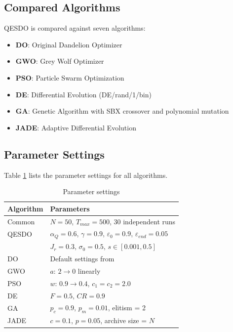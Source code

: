 \documentclass[preprint,12pt]{elsarticle}
\begin{document}
\subsection{Compared Algorithms}
\label{subsec:competitors}

QESDO is compared against seven algorithms:
\begin{itemize}
    \item \textbf{DO}: Original Dandelion Optimizer \cite{zhao2022dandelion}
    \item \textbf{GWO}: Grey Wolf Optimizer \cite{mirjalili2014grey}
    \item \textbf{PSO}: Particle Swarm Optimization \cite{kennedy1995particle}
    \item \textbf{DE}: Differential Evolution (DE/rand/1/bin) \cite{storn1997differential}
    \item \textbf{GA}: Genetic Algorithm with SBX crossover and polynomial mutation
    \item \textbf{JADE}: Adaptive Differential Evolution \cite{zhang2009jade}
\end{itemize}

\subsection{Parameter Settings}
\label{subsec:parameters}

Table \ref{tab:parameters} lists the parameter settings for all algorithms.

\begin{table}[htbp]
\centering
\caption{Parameter settings}
\label{tab:parameters}
\begin{tabular}{ll}
\toprule
\textbf{Algorithm} & \textbf{Parameters} \\
\midrule
Common & $N = 50$, $T_{max} = 500$, 30 independent runs \\
\midrule
QESDO & $\alpha_Q = 0.6$, $\gamma = 0.9$, $\varepsilon_0 = 0.9$, $\varepsilon_{end} = 0.05$ \\
      & $J_r = 0.3$, $\sigma_0 = 0.5$, $s \in [0.001, 0.5]$ \\
DO    & Default settings from \cite{zhao2022dandelion} \\
GWO   & $a$: $2 \rightarrow 0$ linearly \\
PSO   & $w$: $0.9 \rightarrow 0.4$, $c_1 = c_2 = 2.0$ \\
DE    & $F = 0.5$, $CR = 0.9$ \\
GA    & $p_c = 0.9$, $p_m = 0.01$, elitism = 2 \\
JADE  & $c = 0.1$, $p = 0.05$, archive size = $N$ \\
\bottomrule
\end{tabular}
\end{table}
\end{document}
